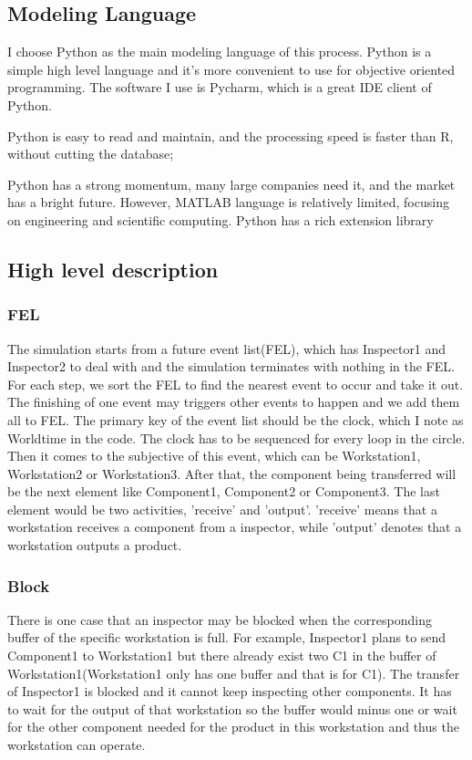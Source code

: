\documentclass{article}
\begin{document}
\subsection{Modeling Language}

I choose Python as the main modeling language of this process. Python is a simple high level language and it's more convenient to use for objective oriented programming. The software I use is Pycharm, which is a great IDE client of Python.

Python is easy to read and maintain, and the processing speed is faster than R, without cutting the database;

Python has a strong momentum, many large companies need it, and the market has a bright future. However, MATLAB language is relatively limited, focusing on engineering and scientific computing. Python has a rich extension library

\subsection{High level description}

\subsubsection{FEL}
The simulation starts from a future event list(FEL), which has Inspector1 and Inspector2 to deal with and the simulation terminates with nothing in the FEL. For each step, we sort the FEL to find the nearest event to occur and take it out. The finishing of one event may triggers other events to happen and we add them all to FEL. The primary key of the event list should be the clock, which I note as Worldtime in the code. The clock has to be sequenced for every loop in the circle. Then it comes to the subjective of this event, which can be Workstation1, Workstation2 or Workstation3. After that, the component being transferred will be the next element like Component1, Component2 or Component3. The last element would be two activities, 'receive' and 'output'. 'receive' means that a workstation receives a component from a inspector, while 'output' denotes that a workstation outputs a product.

\subsubsection{Block}

There is one case that an inspector may be blocked when the corresponding buffer of the specific workstation is full. For example, Inspector1 plans to send Component1 to Workstation1 but there already exist two C1 in the buffer of Workstation1(Workstation1 only has one buffer and that is for C1). The transfer of Inspector1 is blocked and it cannot keep inspecting other components. It has to wait for the output of that workstation so the buffer would minus one or wait for the other component needed for the product in this workstation and thus the workstation can operate.
\end{document}
